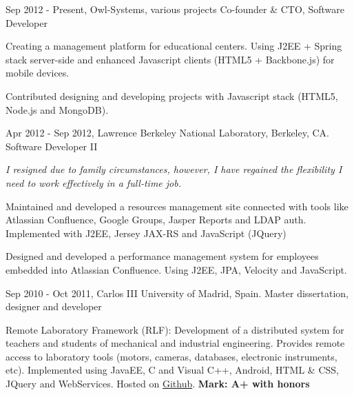 
\experience
  {Sep 2012 - Present, Owl-Systems, various projects}
  {Co-founder \& CTO, Software Developer}
  {\vspace{-1em}\begin{rlist}
    \item Creating a management platform for educational centers. Using J2EE +
    Spring stack server-side and enhanced Javascript clients (HTML5 +
    Backbone.js) for mobile devices.
    \item Contributed designing and developing projects with Javascript stack
    (HTML5, Node.js and MongoDB).
  \end{rlist}}

\experience
  {Apr 2012 - Sep 2012, Lawrence Berkeley National Laboratory, Berkeley, CA.}
  {Software Developer II}
  {\emph{I resigned due to family circumstances, however, I have
    regained the flexibility I need to work effectively in a full-time
    job.}
    \begin{rlist}
    \item Maintained and developed a resources management site
    connected with tools like Atlassian Confluence, Google Groups, Jasper
    Reports and LDAP auth. Implemented with J2EE, Jersey JAX-RS and
    JavaScript (JQuery)
    \item Designed and developed a performance management system for
    employees embedded into Atlassian Confluence. Using J2EE, JPA,
    Velocity and JavaScript.
  \end{rlist}}

\experience
  {Sep 2010 - Oct 2011, Carlos III University of Madrid, Spain.}
  {Master dissertation, designer and developer}
  {\vspace{-1em}\begin{rlist}
    \item Remote Laboratory Framework (RLF): Development of a distributed
    system for teachers and students of mechanical and industrial
    engineering. Provides remote access to laboratory tools (motors,
    cameras, databases, electronic instruments, etc).
    Implemented using JavaEE, C and Visual C++,
    Android, HTML \& CSS, JQuery and WebServices. Hosted on \href{https://github.com/CarlosMecha/remote-laboratory-framework}{Github}.
    \textbf{Mark: A+ with honors}
  \end{rlist}}

